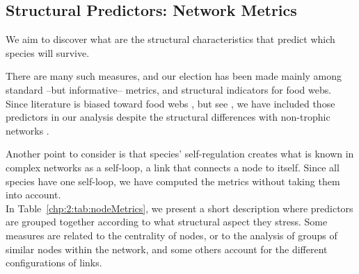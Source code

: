 \subsection{Structural Predictors: Network Metrics}  \label{chp2:2.3}

We aim to discover what are the structural characteristics that predict which species will survive. 


There are many such measures, and our election has been made mainly among standard --but informative-- metrics, and structural indicators for food webs. 
Since literature is biased toward food webs \cite{pascual2006ecological,kefi2020theoretical}, but see \cite{Allesina2009GooglingCoextinctions, Morone2019TheEcosystems}, we have included those predictors in our analysis despite the structural differences with non-trophic networks \cite{Kefi2015NetworkShores,guimaraes2020structure}.

Another point to consider is that species' self-regulation creates what is known in complex networks as a self-loop, a link that connects  a node to itself. Since all species have one self-loop, we have computed the metrics without taking them into account.\\

  In Table~\ref{chp:2:tab:nodeMetrics}, we present a short description where predictors are grouped together according to what structural aspect they stress. Some measures are related to the centrality of nodes, or to the analysis of groups of similar nodes within the network, and some others account for the different configurations of links.

